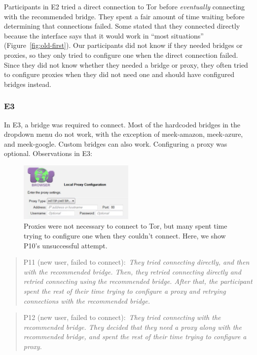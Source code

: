 \documentclass[USenglish,oneside,twocolumn]{article}
\newcommand{\pquote}[2]{
\begin{quotation}
\noindent #1:~\textit{#2}
\end{quotation}
}
\begin{document}
Participants in E2 tried a direct connection to Tor before {\it eventually} connecting with the recommended bridge.
They spent a fair amount of time waiting before determining that connections failed. Some stated that they connected directly because the interface says that it would work in ``most situations'' (Figure~\ref{fig:old-first}). Our participants did not know if they needed bridges or proxies, so they only tried to configure one when the direct connection failed. Since they did not know whether they needed a bridge or proxy, they often tried to configure proxies when they did not need one and should have configured bridges instead.  

\subsubsection{E3}
In E3, a bridge was required to connect. Most of the hardcoded bridges in the dropdown menu do not work, with the exception of meek-amazon, meek-azure, and meek-google. Custom bridges can also work. Configuring a proxy was optional.
Observations in E3: 

\begin{figure}[t]
\centering
\includegraphics[width=0.5\textwidth]{P8-proxy-attempt.png}
\caption{
Proxies were not necessary to connect to Tor, but many spent time trying to configure one when they couldn't connect. Here, we show P10's unsuccessful attempt. 
}
\label{fig:proxy-attempt}
\end{figure}

\pquote{P11 (new user, failed to connect)}{They tried connecting directly, and then with the recommended bridge. Then, they retried connecting directly and retried connecting using the recommended bridge. After that, the participant spent the rest of their time trying to configure a proxy and retrying connections with the recommended bridge.}

\pquote{P12 (new user, failed to connect)}{They tried connecting with the recommended bridge. They decided that they need a proxy along with the recommended bridge, and spent the rest of their time trying to configure a proxy.}
\end{document}

